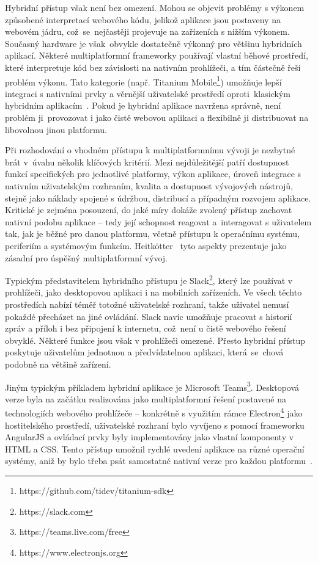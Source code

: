 Hybridní přístup však není bez omezení. Mohou se objevit problémy s výkonem způsobené interpretací webového kódu, jelikož aplikace jsou postaveny na webovém jádru, což~se~nejčastěji projevuje na zařízeních s nižším výkonem. Současný hardware je však~obvykle dostatečně výkonný pro většinu hybridních aplikací. Některé multiplatformní frameworky používají vlastní běhové prostředí, které interpretuje kód bez závislosti na nativním prohlížeči, a tím částečně řeší problém výkonu. Tato kategorie (např. Titanium Mobile\footnote{https://github.com/tidev/titanium-sdk}) umožňuje lepší integraci s nativními prvky a věrnější uživatelské prostředí oproti~klasickým hybridním aplikacím~\cite{HybrydHeitkotter}. Pokud je hybridní aplikace navržena správně, není problém ji~provozovat i jako čistě webovou aplikaci a flexibilně ji distribuovat na libovolnou jinou platformu.
 
Při rozhodování o vhodném přístupu k multiplatformnímu vývoji je nezbytné brát v~úvahu několik klíčových kritérií. Mezi nejdůležitější patří dostupnost funkcí specifických pro jednotlivé platformy, výkon aplikace, úroveň integrace s nativním uživatelským rozhraním, kvalita a dostupnost vývojových nástrojů, stejně jako náklady spojené s údržbou, distribucí a případným rozvojem aplikace. Kritické je zejména posouzení, do jaké míry dokáže zvolený přístup zachovat nativní podobu aplikace -- tedy její schopnost reagovat a~interagovat s uživatelem tak, jak je běžné pro danou platformu, včetně přístupu k operačnímu systému, periferiím a systémovým funkcím. Heitkötter~\cite{HybrydHeitkotter} tyto aspekty prezentuje jako zásadní pro úspěšný multiplatformní vývoj.

Typickým představitelem hybridního přístupu je Slack\footnote{https://slack.com}, který lze používat v prohlížeči, jako desktopovou aplikaci i na mobilních zařízeních. Ve všech těchto prostředích nabízí téměř totožné uživatelské rozhraní, takže uživatel nemusí pokaždé přecházet na jiné ovládání. Slack navíc umožňuje pracovat s historií zpráv a příloh i bez připojení k internetu, což~není u čistě webového řešení obvyklé. Některé funkce jsou však v prohlížeči omezené. Přesto hybridní přístup poskytuje uživatelům jednotnou a předvídatelnou aplikaci, která~se~chová podobně na většině zařízení.

Jiným typickým příkladem hybridní aplikace je Microsoft Teams\footnote{https://teams.live.com/free}. Desktopová verze byla na začátku realizována jako multiplatformní řešení postavené na technologiích webového prohlížeče -- konkrétně s využitím rámce Electron\footnote{https://www.electronjs.org} jako hostitelského prostředí, uživatelské rozhraní bylo vyvíjeno s pomocí frameworku AngularJS a ovládací prvky byly implementovány jako vlastní komponenty v HTML a CSS. Tento přístup umožnil rychlé uvedení aplikace na různé operační systémy, aniž by bylo třeba psát samostatné nativní verze pro každou platformu~\cite{Teams}.

